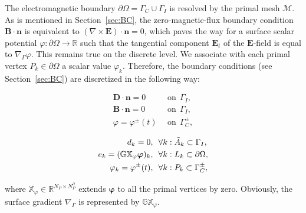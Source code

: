 \documentclass{article}
\begin{document}
The electromagnetic boundary $\partial\Omega = \Gamma_C\cup \Gamma_I$ is resolved by the
primal mesh $\mathcal{M}$. As is mentioned in Section~\ref{sec:BC}, the zero-magnetic-flux
boundary condition $\mathbf{B}\cdot \mathbf{n}$ is equivalent to
$(\nabla\times\mathbf{E}) \cdot \mathbf{n} = 0$, which paves the way for a surface scalar
potential $\varphi:\partial\Omega\to\mathbb{R}$ such that the tangential component
$\mathbf{E}_t$ of the $\mathbf{E}$-field is equal to $\nabla_\Gamma\varphi$. This remains
true on the discrete level. We associate with each primal vertex $P_k \in \partial\Omega$
a scalar value $\varphi_k$. Therefore, the boundary conditions (see Section~\ref{sec:BC})
are discretized in the following way:
\begin{center}
    \vspace{-0.5cm}
    \begin{minipage}{0.3\textwidth}
    \begin{align*}
    \mathbf{D} \cdot \mathbf{n} = 0\ \ &\text{on} \ \  \Gamma_I,  \\
    \mathbf{B} \cdot \mathbf{n} = 0\ \  &\text{on} \ \  \Gamma_I, \\
    \varphi = \varphi^\pm(t)\ \ &\text{on} \ \ \Gamma_C^\pm,
    \end{align*}
    \end{minipage}
    \begin{minipage}{0.1\textwidth}
    \centering
    \end{minipage}
    \begin{minipage}{0.5\textwidth}
        \centering
        \begin{subequations}
            \begin{align}
            d_k = 0,\ \ &\forall k : \Tilde{A}_k \subset \Gamma_I,\label{equ:bc_3} \\
            e_k = (\mathbb{GX}_\varphi\bm{\varphi})_k,\ \ &\forall k : L_k \subset \partial\Omega, \label{equ:bc_2}\\
            \varphi_k = \varphi^\pm(t), \ \ &\forall k : P_k \subset \Gamma_C^\pm, \label{equ:bc_1}
            \end{align}
        \end{subequations}
    \end{minipage}
\end{center}
where $\mathbb{X}_\varphi \in \mathbb{R}^{N_P \times N_P^\partial}$ extends $\bm{\varphi}$
to all the primal vertices by zero. Obviously, the surface gradient $\nabla_\Gamma$ is
represented by $\mathbb{GX}_\varphi$.
\end{document}
